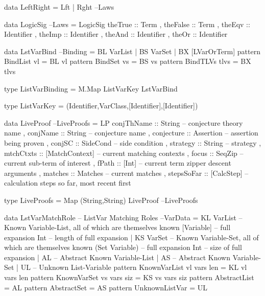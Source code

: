 \begin{code}
data LeftRight = Lft | Rght                                             --Laws
\end{code}

\begin{code}
data LogicSig                                                           --Laws
  = LogicSig
     { theTrue  :: Term
     , theFalse :: Term
     , theEqv   :: Identifier
     , theImp   :: Identifier
     , theAnd   :: Identifier
     , theOr    :: Identifier
     }
\end{code}

\begin{code}
data LstVarBind                                                      --Binding
 = BL  VarList
 | BS  VarSet
 | BX  [LVarOrTerm]
pattern BindList vl      =  BL vl
pattern BindSet  vs      =  BS vs
pattern BindTLVs tlvs    =  BX tlvs
\end{code}

\begin{code}
type ListVarBinding = M.Map ListVarKey LstVarBind
\end{code}

\begin{code}
type ListVarKey = (Identifier,VarClass,[Identifier],[Identifier])
\end{code}

\begin{code}
data LiveProof                                                    --LiveProofs
  = LP {
      conjThName :: String -- conjecture theory name
    , conjName :: String -- conjecture name
    , conjecture :: Assertion -- assertion being proven
    , conjSC :: SideCond -- side condition
    , strategy :: String -- strategy
    , mtchCtxts :: [MatchContext] -- current matching contexts
    , focus :: SeqZip  -- current sub-term of interest
    , fPath :: [Int] -- current term zipper descent arguments
    , matches :: Matches -- current matches
    , stepsSoFar :: [CalcStep]  -- calculation steps so far, most recent first
    }
\end{code}

\begin{code}
type LiveProofs = Map (String,String) LiveProof                   --LiveProofs
\end{code}

\begin{code}
data LstVarMatchRole -- ListVar Matching Roles                       --VarData
 = KL VarList        -- Known Variable-List, all of which are themselves known
      [Variable]     -- full expansion
      Int            -- length of full expansion
 | KS VarSet         -- Known Variable-Set, all of which are themselves known
      (Set Variable) -- full expansion
      Int            -- size of full expansion
 | AL                -- Abstract Known Variable-List
 | AS                -- Abstract Known Variable-Set
 | UL                -- Unknown List-Variable
pattern KnownVarList vl vars len  =  KL vl vars len
pattern KnownVarSet  vs vars siz  =  KS vs vars siz
pattern AbstractList              =  AL
pattern AbstractSet               =  AS
pattern UnknownListVar            =  UL
\end{code}


